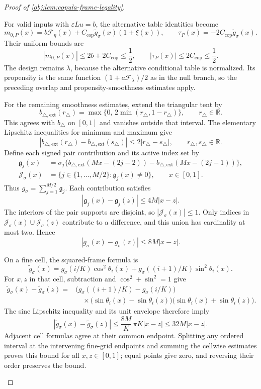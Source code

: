 \documentclass[11pt]{article}
\begin{document}
\begin{proof}[Proof of \cref{obj:lem:copula-frame-legality}]
\begin{enumerate}
For valid inputs with \(\varepsilon Lu=b\), the alternative table identities become
\[
m_{0,P}(x)
=b\mathcal F_\eta(x)
 +C_{\mathrm{cop}}\widetilde g_\sigma(x)(1+\xi(x)),
\qquad
\tau_P(x)=-2C_{\mathrm{cop}}\widetilde g_\sigma(x).
\]
Their uniform bounds are
\[
|m_{0,P}(x)|
\le2b+2C_{\mathrm{cop}}\le\frac12,
\qquad
|\tau_P(x)|\le2C_{\mathrm{cop}}\le\frac12.
\]
The design remains \(\lambda\), because the alternative conditional table is normalized. Its propensity is the same function
\((1+a\mathcal F_\lambda)/2\) as in the null branch, so the preceding overlap and propensity-smoothness estimates apply.

For the remaining smoothness estimates, extend the triangular tent by
\[
b_{\triangle,\mathrm{ext}}(r_\triangle)
=\max\{0,\,2\min(r_\triangle,1-r_\triangle)\},
\qquad r_\triangle\in\mathbb R.
\]
This agrees with \(b_\triangle\) on \([0,1]\) and vanishes outside that interval. The elementary Lipschitz inequalities for minimum and maximum give
\[
|b_{\triangle,\mathrm{ext}}(r_\triangle)
 -b_{\triangle,\mathrm{ext}}(s_\triangle)|
\le2|r_\triangle-s_\triangle|,
\qquad r_\triangle,s_\triangle\in\mathbb R.
\]
Define each signed pair contribution and its active index set by
\[
\begin{aligned}
\mathfrak g_j(x)
&=\sigma_j\bigl\{
b_{\triangle,\mathrm{ext}}(Mx-(2j-2))
-b_{\triangle,\mathrm{ext}}(Mx-(2j-1))
\bigr\},\\
\mathcal J_\sigma(x)
&=\{j\in\{1,\ldots,M/2\}:\mathfrak g_j(x)\ne0\},
\qquad x\in[0,1].
\end{aligned}
\]
Thus \(g_\sigma=\sum_{j=1}^{M/2}\mathfrak g_j\).
Each contribution satisfies
\[
|\mathfrak g_j(x)-\mathfrak g_j(z)|
\le4M|x-z|.
\]
The interiors of the pair supports are disjoint, so
\(|\mathcal J_\sigma(x)|\le1\). Only indices in
\(\mathcal J_\sigma(x)\cup\mathcal J_\sigma(z)\) contribute to a difference, and this union has cardinality at most two. Hence
\[
|g_\sigma(x)-g_\sigma(z)|\le8M|x-z|.
\]

On a fine cell, the squared-frame formula is
\[
\widetilde g_\sigma(x)
=g_\sigma(i/K)\cos^2\theta_i(x)
 +g_\sigma((i+1)/K)\sin^2\theta_i(x).
\]
For \(x,z\) in that cell, subtraction and
\(\cos^2+\sin^2=1\) give
\[
\begin{aligned}
\widetilde g_\sigma(x)-\widetilde g_\sigma(z)
={}&\bigl(g_\sigma((i+1)/K)-g_\sigma(i/K)\bigr)\\
&\quad{}\times
\bigl(\sin\theta_i(x)-\sin\theta_i(z)\bigr)
\bigl(\sin\theta_i(x)+\sin\theta_i(z)\bigr).
\end{aligned}
\]
The sine Lipschitz inequality and its unit envelope therefore imply
\[
|\widetilde g_\sigma(x)-\widetilde g_\sigma(z)|
\le\frac{8M}{K}\,\pi K|x-z|
\le32M|x-z|.
\]
Adjacent cell formulas agree at their common endpoint. Splitting any ordered interval at the intervening fine-grid endpoints and summing the cellwise estimates proves this bound for all \(x,z\in[0,1]\); equal points give zero, and reversing their order preserves the bound.


\end{enumerate}
\end{proof}
\end{document}
